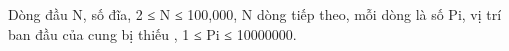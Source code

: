 Dòng đầu N, số đĩa, 2 ≤ N ≤ 100,000,  N dòng tiếp theo, mỗi dòng là số Pi, vị trí ban đầu của cung bị thiếu , 1 ≤ Pi ≤ 10000000.
